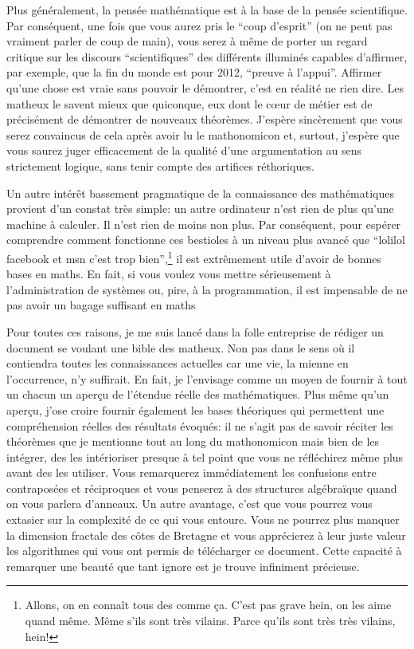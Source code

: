 Plus généralement, la pensée mathématique est à la base de la pensée
scientifique. Par conséquent, une fois que vous aurez pris le ``coup
d'esprit'' (on ne peut pas vraiment parler de coup de main), vous
serez à même de porter un regard critique sur les discours
``scientifiques'' des différents illuminés capables d'affirmer, par
exemple, que la fin du monde est pour 2012, ``preuve à
l'appui''. Affirmer qu'une chose est vraie sans pouvoir le démontrer,
c'est en réalité ne rien dire. Les matheux le savent mieux que
quiconque, eux dont le cœur de métier est de précisément de démontrer
de nouveaux théorèmes. J'espère sincèrement que vous serez convaincus
de cela après avoir lu le mathonomicon et, surtout, j'espère que vous
saurez juger efficacement de la qualité d'une argumentation au sens
strictement logique, sans tenir compte des artifices réthoriques.


Un autre intérêt bassement pragmatique de la connaissance des
mathématiques provient d'un constat très simple: un autre ordinateur
n'est rien de plus qu'une machine à calculer. Il n'est rien de moins
non plus. Par conséquent, pour espérer comprendre comment fonctionne
ces bestioles à un niveau plus avancé que ``lolilol facebook et msn
c'est trop bien'',\footnote{Allons, on en connaît tous des comme
  ça. C'est pas grave hein, on les aime quand même. Même s'ils sont
  très vilains. Parce qu'ils sont très très vilains, hein!} il
est extrêmement utile d'avoir de bonnes bases en maths. En fait, si
vous voulez vous mettre sérieusement à l'administration de systèmes
ou, pire, à la programmation, il est impensable de ne pas avoir un
bagage suffisant en maths

Pour toutes ces raisons, je me suis lancé dans la folle entreprise de
rédiger un document se voulant une bible des matheux. Non pas dans le
sens où il contiendra toutes les connaissances actuelles car une vie,
la mienne en l'occurrence, n'y suffirait. En fait, je l'envisage comme
un moyen de fournir à tout un chacun un aperçu de l'étendue réelle des
mathématiques. Plus même qu'un aperçu, j'ose croire fournir également
les bases théoriques qui permettent une compréhension réelles des
résultats évoqués: il ne s'agit pas de savoir réciter les théorèmes
que je mentionne tout au long du mathonomicon mais bien de les
intégrer, des les intérioriser presque à tel point que vous ne
réfléchirez même plus avant des les utiliser. Vous remarquerez
immédiatement les confusions entre contraposées et réciproques et vous
penserez à des structures algébraïque quand on vous parlera
d'anneaux. Un autre avantage, c'est que vous pourrez vous extasier sur
la complexité de ce qui vous entoure. Vous ne pourrez plus manquer la
dimension fractale des côtes de Bretagne et vous apprécierez à leur
juste valeur les algorithmes qui vous ont permis de télécharger ce
document. Cette capacité à remarquer une beauté que tant ignore est je
trouve infiniment précieuse.


